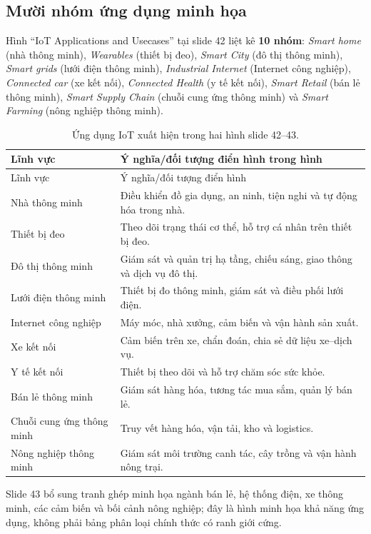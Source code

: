 \subsection{Mười nhóm ứng dụng minh họa}
Hình ``IoT Applications and Usecases'' tại slide 42 liệt kê \textbf{10 nhóm}: \emph{Smart home} (nhà thông minh), \emph{Wearables} (thiết bị đeo), \emph{Smart City} (đô thị thông minh), \emph{Smart grids} (lưới điện thông minh), \emph{Industrial Internet} (Internet công nghiệp), \emph{Connected car} (xe kết nối), \emph{Connected Health} (y tế kết nối), \emph{Smart Retail} (bán lẻ thông minh), \emph{Smart Supply Chain} (chuỗi cung ứng thông minh) và \emph{Smart Farming} (nông nghiệp thông minh).
\begin{longtable}{@{}p{.26\linewidth}p{.68\linewidth}@{}}\caption{Ứng dụng IoT xuất hiện trong hai hình slide 42--43.}\\\toprule
Lĩnh vực & Ý nghĩa/đối tượng điển hình trong hình\\\midrule\endfirsthead\toprule Lĩnh vực & Ý nghĩa/đối tượng điển hình\\\midrule\endhead
Nhà thông minh & Điều khiển đồ gia dụng, an ninh, tiện nghi và tự động hóa trong nhà.\\
Thiết bị đeo & Theo dõi trạng thái cơ thể, hỗ trợ cá nhân trên thiết bị đeo.\\
Đô thị thông minh & Giám sát và quản trị hạ tầng, chiếu sáng, giao thông và dịch vụ đô thị.\\
Lưới điện thông minh & Thiết bị đo thông minh, giám sát và điều phối lưới điện.\\
Internet công nghiệp & Máy móc, nhà xưởng, cảm biến và vận hành sản xuất.\\
Xe kết nối & Cảm biến trên xe, chẩn đoán, chia sẻ dữ liệu xe--dịch vụ.\\
Y tế kết nối & Thiết bị theo dõi và hỗ trợ chăm sóc sức khỏe.\\
Bán lẻ thông minh & Giám sát hàng hóa, tương tác mua sắm, quản lý bán lẻ.\\
Chuỗi cung ứng thông minh & Truy vết hàng hóa, vận tải, kho và logistics.\\
Nông nghiệp thông minh & Giám sát môi trường canh tác, cây trồng và vận hành nông trại.\\\bottomrule
\end{longtable}
Slide 43 bổ sung tranh ghép minh họa ngành bán lẻ, hệ thống điện, xe thông minh, các cảm biến và bối cảnh nông nghiệp; đây là hình minh họa khả năng ứng dụng, không phải bảng phân loại chính thức có ranh giới cứng.

